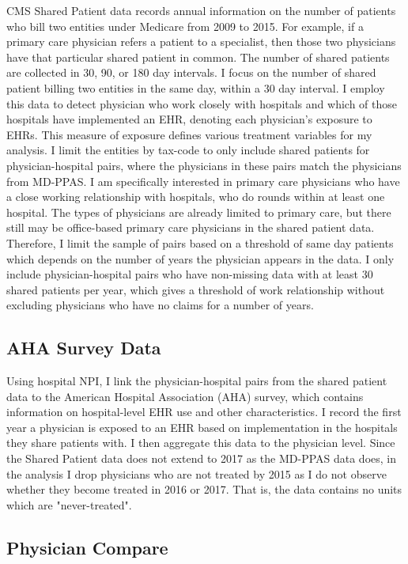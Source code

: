 \documentclass[11pt]{article}
\begin{document}
CMS Shared Patient data records annual information on the number of patients who bill two entities under Medicare from 2009 to 2015. For example, if a primary care physician refers a patient to a specialist, then those two physicians have that particular shared patient in common. The number of shared patients are collected in 30, 90, or 180 day intervals. I focus on the number of shared patient billing two entities in the same day, within a 30 day interval. I employ this data to detect physician who work closely with hospitals and which of those hospitals have implemented an EHR, denoting each physician's exposure to EHRs. This measure of exposure defines various treatment variables for my analysis. I limit the entities by tax-code to only include shared patients for physician-hospital pairs, where the physicians in these pairs match the physicians from MD-PPAS. I am specifically interested in primary care physicians who have a close working relationship with hospitals, who do rounds within at least one hospital. The types of physicians are already limited to primary care, but there still may be office-based primary care physicians in the shared patient data. Therefore, I limit the sample of pairs based on a threshold of same day patients which depends on the number of years the physician appears in the data. I only include physician-hospital pairs who have non-missing data with at least 30 shared patients per year, which gives a threshold of work relationship without excluding physicians who have no claims for a number of years.

\subsection{AHA Survey Data}

Using hospital NPI, I link the physician-hospital pairs from the shared patient data to the American Hospital Association (AHA) survey, which contains information on hospital-level EHR use and other characteristics. I record the first year a physician is exposed to an EHR based on implementation in the hospitals they share patients with. I then aggregate this data to the physician level. Since the Shared Patient data does not extend to 2017 as the MD-PPAS data does, in the analysis I drop physicians who are not treated by 2015 as I do not observe whether they become treated in 2016 or 2017. That is, the data contains no units which are "never-treated".

\subsection{Physician Compare}
\end{document}
